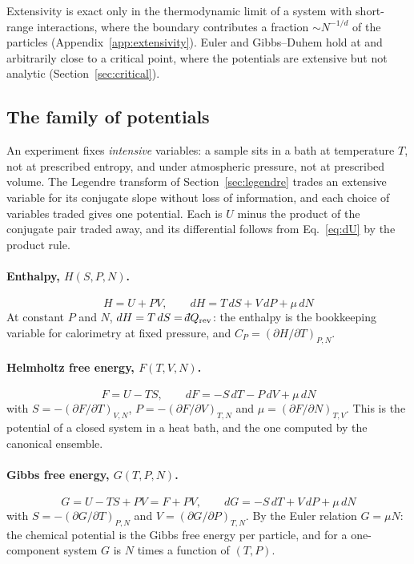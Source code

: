 \documentclass[10pt,a4paper]{article}
\theoremstyle{remark}
\newcommand{\dbar}{\mathchar'26\mkern-11mu d}
\begin{document}
Extensivity is exact only in the thermodynamic limit of a system with
short-range interactions, where the boundary contributes a fraction
$\sim N^{-1/d}$ of the particles (Appendix~\ref{app:extensivity}). Euler and
Gibbs--Duhem hold at and arbitrarily close to a critical point, where the
potentials are extensive but not analytic (Section~\ref{sec:critical}).

\subsection{The family of potentials}
\label{sec:family}

An experiment fixes \emph{intensive} variables: a sample sits in a bath at
temperature $T$, not at prescribed entropy, and under atmospheric pressure, not
at prescribed volume. The Legendre transform of Section~\ref{sec:legendre}
trades an extensive variable for its conjugate slope without loss of
information, and each choice of variables traded gives one potential. Each is
$U$ minus the product of the conjugate pair traded away, and its differential
follows from Eq.~\eqref{eq:dU} by the product rule.

\paragraph{Enthalpy, $H(S,P,N)$.}
\[
  \;H=U+PV ,\qquad dH=T\,dS+V\,dP+\mu\,dN\
\]
At constant $P$ and $N$, $dH=T\,dS=\dbar Q_{\rm rev}$: the enthalpy is the
bookkeeping variable for calorimetry at fixed pressure, and
$C_P=(\partial H/\partial T)_{P,N}$.

\paragraph{Helmholtz free energy, $F(T,V,N)$.}
\[
  \;F=U-TS ,\qquad dF=-S\,dT-P\,dV+\mu\,dN\
\]
with $S=-(\partial F/\partial T)_{V,N}$, $P=-(\partial F/\partial V)_{T,N}$ and
$\mu=(\partial F/\partial N)_{T,V}$. This is the potential of a closed system
in a heat bath, and the one computed by the canonical ensemble.

\paragraph{Gibbs free energy, $G(T,P,N)$.}
\[
  \;G=U-TS+PV=F+PV ,\qquad dG=-S\,dT+V\,dP+\mu\,dN\
\]
with $S=-(\partial G/\partial T)_{P,N}$ and $V=(\partial G/\partial P)_{T,N}$.
By the Euler relation $G=\mu N$: the chemical potential is the Gibbs free
energy per particle, and for a one-component system $G$ is $N$ times a
function of $(T,P)$.
\end{document}
